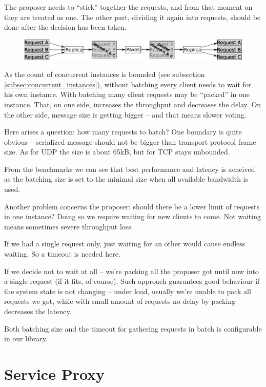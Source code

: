 The proposer needs to ``stick'' together the requests, and from that moment on they are treated as one. The other part, dividing it again into requests, should be done after the decision has been taken.
\begin{figure}[h]
\includegraphics[keepaspectratio, width=\textwidth]{features/batching.pdf}
\end{figure}

As the count of concurrent instances is bounded (see subsection \ref{subsec:concurrent_instances}), without batching every client needs to wait for his own instance. With batching many client requests may be ``packed'' in one instance. That, on one side, increases the throughput and decreases the delay.
On the other side, message size is getting bigger -- and that means slower voting.

Here arises a question: how many requests to batch? One boundary is quite obvious -- serialized message should not be bigger than transport protocol frame size. As for UDP the size is about 65kB, but for TCP stays unbounded.

From the benchmarks %
we can see that best performance and latency is acheived as the batching size is set to the minimal size when all available bandwidth is used.

Another problem concerns the proposer: should there be a lower limit of requests in one instance? Doing so we require waiting for new clients to come. Not waiting means sometimes severe throughput loss.

If we had a single request only, just waiting for an other would cause endless waiting. So a timeout is needed here.

If we decide not to wait at all -- we're packing all the proposer got until now into a single request (if it fits, of course). Such approach guarantees good behaviour if the system state is not changing -- under load, usually we're unable to pack all requests we got, while with small amount of requests no delay by packing decreases the latency.

Both batching size and the timeout for gathering requests in batch is configurable in our library.

\section{Service Proxy}

